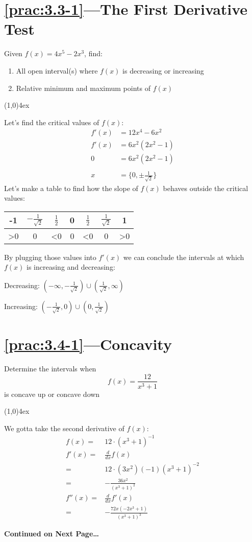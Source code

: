 \documentclass{MathNotes}
\newcommand{\continued}{
	\mbox{}
	\vfill
	\textbf{Continued on Next Page\ldots}\newpage
}
\newcommand{\br}{
	\begin{center}
		\line(1,0){4ex}
	\end{center}}
\begin{document}
\section*{\ref{prac:3.3-1}---The First Derivative Test}\label{ans:3.3-1}
Given $\displaystyle f(x)=4x^5-2x^3$, find:
\begin{enumerate}
	\item All open interval(s) where $f(x)$ is decreasing or increasing
	\item Relative minimum and maximum points of $f(x)$
\end{enumerate}
\br
Let's find the critical values of $f(x)$:
\begin{align*}
	f'(x) & =12x^4-6x^2                  \\
	f'(x) & =6x^2(2x^2-1)                \\
	0     & =6x^2(2x^2-1)                \\
	\\
	x     & =\{0,\pm\frac{1}{\sqrt{2}}\}
\end{align*}
Let's make a table to find how the slope of $f(x)$ behaves outside the critical
values:
\begin{center}
	\begin{tabular}{c|c|c|c|c|c|c}
		-1          & $-\frac{1}{\sqrt{2}}$ & $\frac{1}{2}$ & 0 & $\frac{1}{2}$ & $\frac{1}
		{\sqrt{2}}$ & 1                                                                     \\
		\hline
		>0          & 0                     & <0            & 0 & <0            & 0
		            & >0
	\end{tabular}
\end{center}
By plugging those values into $f'(x)$ we can conclude the intervals at which
$f(x)$ is increasing and decreasing:
\begin{multicols}{2}
	\centering
	Decreasing: $(-\infty,-\frac{1}{\sqrt{2}})\cup(\frac{1}{\sqrt{2}},\infty)$

	Increasing: $(-\frac{1}{\sqrt{2}},0)\cup(0,\frac{1}{\sqrt{2}})$
\end{multicols}

\section*{\ref{prac:3.4-1}---Concavity}\label{ans:3.4-1}
Determine the intervals when \[f(x)=\frac{12}{x^3+1}\] is concave up
or concave down
\br
We gotta take the second derivative of $f(x)$:
\begin{align*}
	f(x) =  & 12\cdot(x^3+1)^{-1}                        \\
	f'(x)=  & \frac{d}{dx}f(x)                           \\
	=       & 12\cdot(3x^2)(-1)(x^3+1)^{-2}              \\
	=       & -\frac{36x^2}{\left(x^3+1\right)^2}        \\
	f''(x)= & \frac{d}{dx}f'(x)                          \\
	=       & -\frac{72x(-2x^3+1)}{\left(x^3+1\right)^3}
\end{align*}
\continued{}
\end{document}
